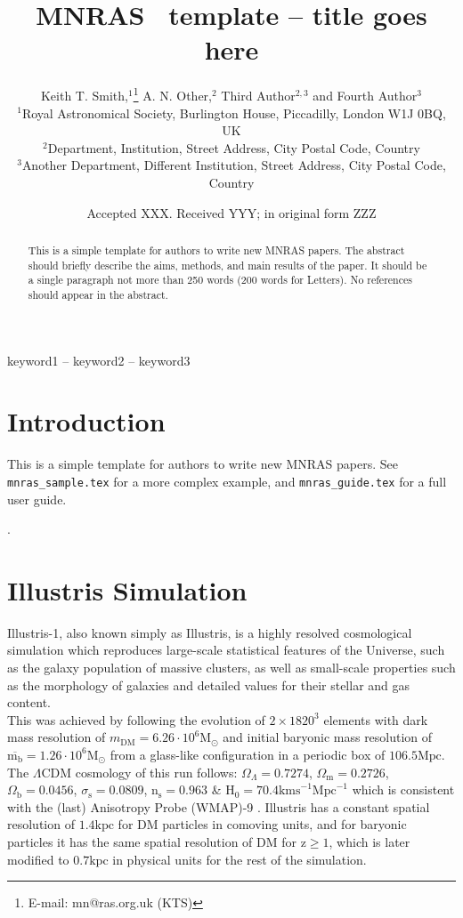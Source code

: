 \documentclass[a4paper,fleqn,usenatbib]{mnras}
\title[Short title, max. 45 characters]{MNRAS \LaTeXe\ template -- title goes here}
\author[K. T. Smith et al.]{
Keith T. Smith,$^{1}$\thanks{E-mail: mn@ras.org.uk (KTS)}
A. N. Other,$^{2}$
Third Author$^{2,3}$
and Fourth Author$^{3}$
\\
$^{1}$Royal Astronomical Society, Burlington House, Piccadilly, London W1J 0BQ, UK\\
$^{2}$Department, Institution, Street Address, City Postal Code, Country\\
$^{3}$Another Department, Different Institution, Street Address, City Postal Code, Country
}
\date{Accepted XXX. Received YYY; in original form ZZZ}
\begin{document}
\label{firstpage}
\pagerange{\pageref{firstpage}--\pageref{lastpage}}
\maketitle

\begin{abstract}
This is a simple template for authors to write new MNRAS papers.
The abstract should briefly describe the aims, methods, and main results of the paper.
It should be a single paragraph not more than 250 words (200 words for Letters).
No references should appear in the abstract.
\end{abstract}

\begin{keywords}
keyword1 -- keyword2 -- keyword3
\end{keywords}



\section{Introduction}

This is a simple template for authors to write new MNRAS papers.
See \texttt{mnras\_sample.tex} for a more complex example, and \texttt{mnras\_guide.tex}
for a full user guide.

\cite{Tweb}.

\section{Illustris Simulation}
Illustris-1, also known simply as Illustris, is a highly resolved cosmological simulation which reproduces large-scale statistical features of the Universe, such as the galaxy population of massive clusters, as well as small-scale properties such as the morphology of galaxies and detailed values for their stellar and gas content.\\

This was achieved by following the evolution of $2 \times 1820^3$ elements with dark mass resolution of $m_{\text{DM}} = 6.26\cdot 10^6\text{M}_{\odot}$ and initial baryonic mass resolution of $\overline{\text{m}_\text{b}}=1.26\cdot 10^6\text{M}_{\odot}$ from a glass-like configuration in a periodic box of $106.5\text{Mpc}$. The $\Lambda \text{CDM}$ cosmology of this run follows: $\Omega_\Lambda=0.7274$, $\Omega_\text{m}=0.2726$, $\Omega_\text{b}=0.0456$, $\sigma_\text{s}=0.0809$, $\text{n}_\text{s}=0.963$ \& $\text{H}_0=70.4\text{kms}
^{-1}\text{Mpc}^{-1}$ which is consistent with the (last) Anisotropy Probe (WMAP)-9 \cite{AnisotropyProbe}. Illustris has a constant spatial resolution of $1.4\text{kpc}$ for DM particles in comoving units, and for baryonic particles it has the same spatial resolution of DM for $\text{z}\geq 1$, which is later modified to $0.7\text{kpc}$ in physical units for the rest of the simulation. \\
\end{document}
